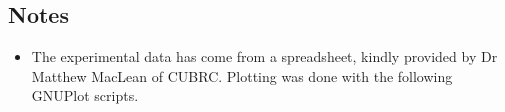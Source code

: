 \noindent
\topbar

\bottombar

\noindent
\topbar

\bottombar

\subsection{Notes}
\begin{itemize}
 \item The experimental data has come from a spreadsheet, 
 kindly provided by Dr Matthew MacLean of CUBRC.
 Plotting was done with the following GNUPlot scripts.
 
 
\end{itemize}
